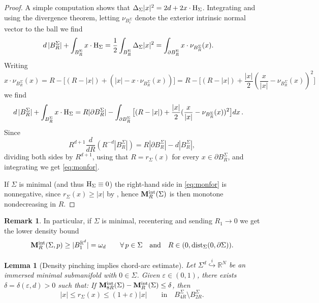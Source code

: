\documentclass{article}
\newcommand{\eps}{\varepsilon}
\newcommand{\R}{\mathbb{R}}
\newcommand{\ep}{\varepsilon}
\newtheorem{lemma}[theorem]{Lemma}
\theoremstyle{definition}
\newtheorem{remark}[theorem]{Remark}
\begin{document}
\begin{proof}
    A simple computation shows that $\Delta_\Sigma |x|^2=2d+ 2x\cdot{\rm H}_\Sigma$. Integrating and using the divergence theorem, letting $\nu_{B_r^\Sigma}$ denote the exterior intrinsic normal vector to the ball we find
    \begin{align*}
    d\,|B_R^\Sigma|+\int_{B_R^\Sigma}x\cdot{\rm H}_\Sigma&=\frac{1}{2}\int_{B_R^\Sigma} \Delta_\Sigma |x|^2=\int_{\partial B_R^\Sigma} x\cdot \nu_{B_R^\Sigma}(x).
        \end{align*}
        Writing
        $$x\cdot \nu_{B_R^\Sigma}(x)=R-\big[(R-|x|)+(|x|-x\cdot\nu_{B_R^\Sigma}(x))\big]=R-\big[(R-|x|)+\frac{|x|}{2}(\frac{x}{|x|}-\nu_{B_R^\Sigma}(x))^2\big]$$
        we find
        \begin{align*}
        d\,|B_R^\Sigma|+\int_{B_R^\Sigma}x\cdot{\rm H}_\Sigma&=R|\partial B_R^\Sigma|-\int_{\partial B_R^\Sigma} \big[(R-|x|)+\frac{|x|}{2}(\frac{x}{|x|}-\nu_{B_R^\Sigma}(x))^2\big]dx\,.
    \end{align*}
    Since
    $$R^{d+1}\frac{d}{dR}(R^{-d}|B_R^\Sigma|)=R|\partial B_R^\Sigma|-d|B_R^\Sigma|,$$
    dividing both sides by $R^{d+1}$, using that $R=r_\Sigma(x)$ for every $x\in\partial B_R^\Sigma$, and
    integrating we get \eqref{eq:monfor}.
    
    If $\Sigma$ is minimal (and thus ${\rm H_\Sigma}\equiv 0$) the right-hand side in \eqref{eq:monfor} is nonnegative, since $r_\Sigma(x)\geq |x|$ by , hence ${\bf M}_R^{\rm int}(\Sigma)$ is then monotone nondecreasing in $R$.
\end{proof}
\begin{remark}\label{rmk:lowdens}
     In particular, if $\Sigma$ is minimal, recentering  and sending $R_1\to 0$ we get the lower density bound
    $${\bf M}_R^{\rm int}(\Sigma,p)\geq |B_1^{\R^d}|=\omega_d\qquad \forall\, p\in \Sigma\quad\mbox{and}\quad R\in(0,{\rm dist}_\Sigma(0,\partial\Sigma)).$$
\end{remark}
\begin{lemma}[Density pinching implies chord-arc estimate]\label{lem:chordarc}
    Let $\Sigma^d\overset{i}{\hookrightarrow}\R^N$ be an immersed minimal submanifold with $0\in\Sigma$. Given $\eps\in(0,1)$, there exists $\delta=\delta(\eps,d)>0$ such that: If ${\bf M}_{8R}^{\rm int}(\Sigma)-{\bf M}_R^{\rm int}(\Sigma)\leq \delta$, then 
    $$|x|\leq r_\Sigma(x)\leq (1+\ep)|x|\qquad \mbox{in} \quad B_{4R}^\Sigma\setminus B_{2R}^\Sigma.$$
\end{lemma}
\end{document}
